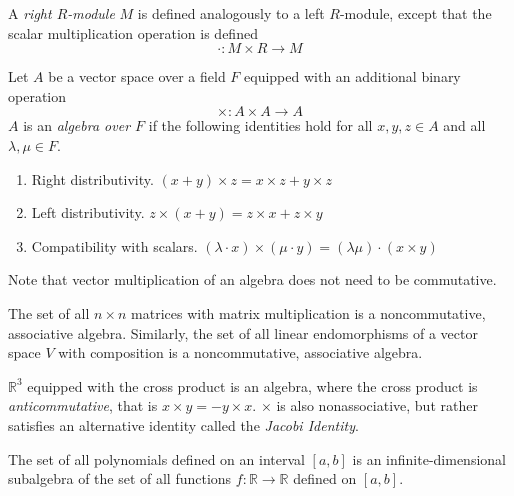 \documentclass{article}
\begin{document}
    \begin{definition}
      A \textit{right $R$-module} $M$ is defined analogously to a left $R$-module, except that the scalar multiplication operation is defined
      \begin{equation}
        \cdot: M \times R \longrightarrow M
      \end{equation}
    \end{definition}

    \begin{definition}
      Let $A$ be a vector space over a field $F$ equipped with an additional binary operation 
      \begin{equation}
        \times: A \times A \longrightarrow A
      \end{equation}
      $A$ is an \textit{algebra over $F$} if the following identities hold for all $x, y, z \in A$ and all $\lambda, \mu \in F$. 
      \begin{enumerate}
        \item Right distributivity. $(x + y) \times z = x \times z + y \times z$ 
        \item Left distributivity. $z \times (x + y) = z \times x + z \times y$
        \item Compatibility with scalars. $(\lambda \cdot x ) \times (\mu \cdot y) = (\lambda \mu) \cdot (x \times y)$ 
      \end{enumerate}
    \end{definition}

    Note that vector multiplication of an algebra does not need to be commutative. 

    \begin{example}
      The set of all $n \times n$ matrices with matrix multiplication is a noncommutative, associative algebra. Similarly, the set of all linear endomorphisms of a vector space $V$ with composition is a noncommutative, associative algebra. 
    \end{example}

    \begin{example}
      $\mathbb{R}^3$ equipped with the cross product is an algebra, where the cross product is \textit{anticommutative}, that is $x \times y = - y \times x$. $\times$ is also nonassociative, but rather satisfies an alternative identity called the \textit{Jacobi Identity}. 
    \end{example}

    \begin{example}
      The set of all polynomials defined on an interval $[a,b]$ is an infinite-dimensional subalgebra of the set of all functions $f: \mathbb{R} \longrightarrow \mathbb{R}$ defined on $[a,b]$.
    \end{example}
\end{document}
